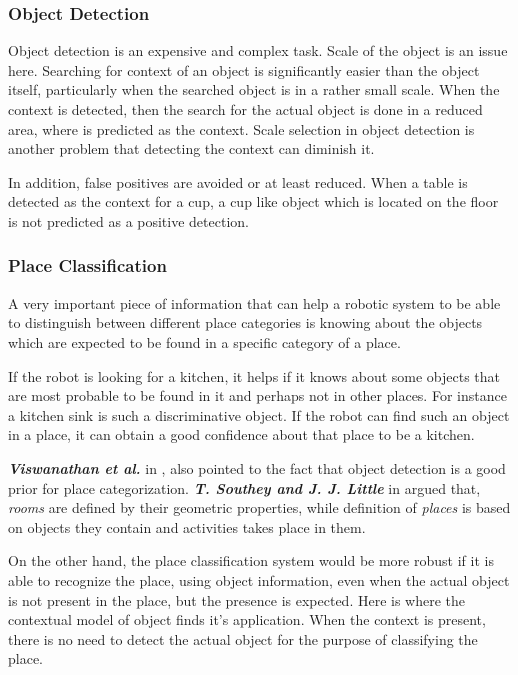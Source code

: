 \subsubsection*{Object Detection}

Object detection is an expensive and complex task. Scale of the object is an issue here. Searching for context of 
an object is significantly easier than the object itself, particularly when the searched object is in a rather small scale. 
When the context is detected, then the search for the actual object is done in a reduced area, where is predicted as the context. 
Scale selection in object detection is another problem that detecting the context can diminish it.  

In addition, false positives are avoided or at least reduced. When a table is detected as the context for a cup, a cup like object 
which is located on the floor is not predicted as a positive detection.    

\subsubsection*{Place Classification}
 
      A very important piece of information that can help a robotic system to be able to distinguish between different place categories 
is knowing about the objects which are expected to be found in a specific category of a place. 

If the robot is looking for a kitchen, it helps if it knows about some objects that are most probable to be found in it and 
perhaps not in other places. 
For instance a kitchen sink is such a discriminative object. 
If the robot can find such an object in a place, it can obtain a good confidence about that place to be a kitchen. 

{\bf\it Viswanathan et al.} in \cite{P.Viswanathan}, also  pointed to the fact that object detection is a good prior for place 
categorization. {\bf\it T. Southey and J. J. Little} in \cite{southey2006object} argued that, {\it rooms} are defined by their geometric 
properties, while definition of {\it places} is based on objects they contain and activities takes place in them.  

On the other hand, the place classification system would be more robust if it is able to recognize the place, using object information, 
even when the actual object is not present in the place, but the presence is expected.
Here is where the contextual model of object finds it's application. When the context is present, there is no need to detect the actual 
object for the purpose of classifying the place.

